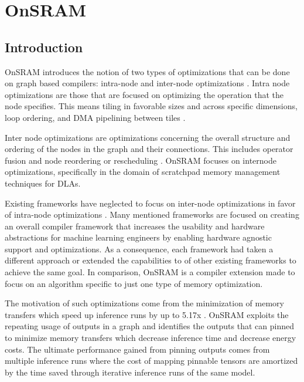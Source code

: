 
\chapter{OnSRAM} %

\label{Chapter3} %


\section{Introduction}

OnSRAM introduces the notion of two types of optimizations that can be done on
graph based compilers: intra-node and inter-node optimizations \cite{onsram}.
Intra node optimizations are those that are focused on optimizing the operation
that the node specifies. This means tiling in favorable sizes and across
specific dimensions, loop ordering, and DMA pipelining
between tiles \cite{aladdin}.

Inter node optimizations are optimizations concerning the overall structure and
ordering of the nodes in the graph and their connections. This includes
operator fusion and node reordering or rescheduling \cite{onsram}.
OnSRAM focuses on internode optimizations, specifically in the domain of
scratchpad memory management techniques for DLAs. 

Existing frameworks have neglected to focus on inter-node optimizations in favor
of intra-node optimizations \cite{tvm} \cite{deeptools} \cite{tensorflow}. Many 
mentioned frameworks are focused on creating an overall compiler framework that
increases the usability and hardware abstractions for machine learning engineers
by enabling hardware agnostic support and optimizations. As a consequence, each
framework had taken a different approach or extended the capabilities to of other
existing frameworks to achieve the same goal. In comparison, OnSRAM is a
compiler extension made to focus on an algorithm specific to just one type of
memory optimization.

The motivation of such optimizations come from the minimization of memory
transfers which speed up inference runs by up to 5.17x \cite{onsram}. OnSRAM
exploits the repeating usage of outputs in a graph and identifies the outputs
that can pinned to minimize memory transfers which decrease inference time and
decrease energy costs. The ultimate performance gained from pinning outputs comes from
multiple inference runs where the cost of mapping pinnable tensors are amortized by the
time saved through iterative inference runs of the same model.

